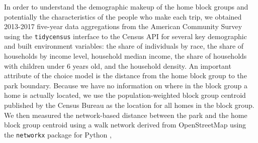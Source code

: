 \documentclass[3p, authoryear, review]{elsarticle} %
\begin{document}
In order to understand the demographic makeup of the home block groups and potentially the characteristics of the people who make each trip, we obtained 2013-2017 five-year data aggregations from the American Community Survey using the \texttt{tidycensus} \citep{Walker2019} interface to the Census API for several key demographic and built environment variables: the share of individuals by race, the share of households by income level, household median income, the share of households with children under 6 years old, and the household density. An important attribute of the choice model is the distance from the home block group to the park boundary. Because we have no information on where in the block group a home is actually located, we use the population-weighted block group centroid published by the Census Bureau as the location for all homes in the block group. We then measured the network-based distance between the park and the home block group centroid using a walk network derived from OpenStreetMap using the \texttt{networkx} package
for Python \citep{networkx},

\begin{table}

\caption{\label{tab:acs-table}Block Group Summary Statistics}
\centering
{}
\end{table}
\end{document}

